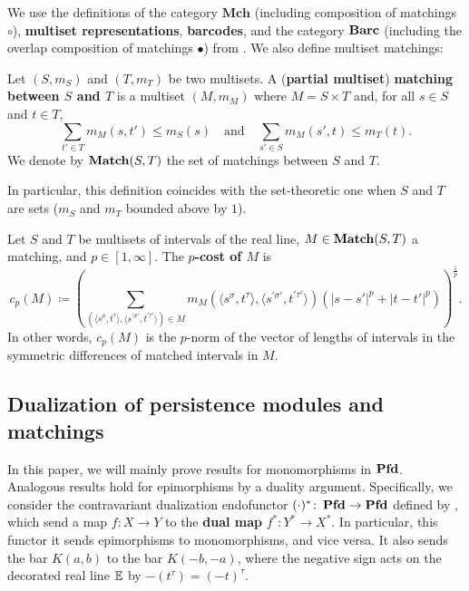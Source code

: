 We use the definitions of the category $\mathbf{Mch}$ (including composition of matchings $\circ$), \textbf{multiset representations}, \textbf{barcodes}, and the category $\operatorname{\mathbf{Barc}}$ (including the overlap composition of matchings $\bullet$) from \cite{BauerLesnick2020}. We also define multiset matchings:

\begin{definition}
  Let $(S, m_S)$ and $(T, m_T)$ be two multisets. A (\textbf{partial multiset}) \textbf{matching between $S$ and $T$} is a multiset $(M, m_M)$ where $M = S \times T$ and, for all $s \in S$ and $t \in T$,
  \[
    \sum_{t' \in T} m_M(s, t') \leq m_S(s)
    \quad \text{and} \quad
    \sum_{s' \in S} m_M(s', t) \leq m_T(t)
    .
  \]
  We denote by $\operatorname{\mathbf{Match}}(S, T)$ the set of matchings between $S$ and $T$.
\end{definition}

In particular, this definition coincides with the set-theoretic one when $S$ and $T$ are sets ($m_S$ and $m_T$ bounded above by $1$).

\begin{definition}
  Let $S$ and $T$ be multisets of intervals of the real line, $M \in \operatorname{\mathbf{Match}}(S, T)$ a matching, and $p \in [1, \infty]$. The \textbf{$p$-cost of $M$} is
  \[
    c_p(M) \coloneq \left( \sum_{(\langle s^\sigma, t^\tau \rangle, \langle s^{\prime \sigma'}, t^{\prime \tau'} \rangle) \in M} m_M(\langle s^\sigma, t^\tau \rangle, \langle s^{\prime \sigma'}, t^{\prime \tau'} \rangle) (|s - s'|^p + |t - t'|^p) \right)^{\frac{1}{p}}.
  \]
  In other words, $c_p(M)$ is the $p$-norm of the vector of lengths of intervals in the symmetric differences of matched intervals in $M$.
\end{definition}

\subsection{Dualization of persistence modules and matchings}
\label{C!SS:dual}

In this paper, we will mainly prove results for monomorphisms in $\operatorname{\mathbf{Pfd}}$. Analogous results hold for epimorphisms by a duality argument. Specifically, we consider the contravariant dualization endofunctor $(\cdot)^* \colon \operatorname{\mathbf{Pfd}} \to \operatorname{\mathbf{Pfd}}$ defined by \cite[Section 3.4]{BauerLesnick2015}, which send a map $f \colon X \to Y$ to the \textbf{dual map} $f^* \colon Y^* \to X^*$. In particular, this functor it sends epimorphisms to monomorphisms, and vice versa. It also sends the bar $K(a, b)$ to the bar $K(-b, -a)$, where the negative sign acts on the decorated real line $\mathbb{E}$ by $-(t^\tau) = (-t)^\tau$.

